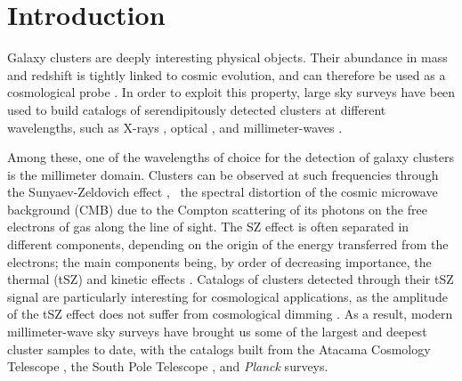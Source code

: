\section{Introduction}
\label{sec:intro}

Galaxy clusters are deeply interesting physical objects.
Their abundance in mass and redshift is tightly linked to cosmic evolution, and can therefore be used as a cosmological probe \citep[see \eg][for a review]{allen_cosmological_2011}.
In order to exploit this property, large sky surveys have been used to build catalogs of serendipitously detected clusters at different wavelengths, such as X-rays \citep[\eg][]{liu_erosita_2022}, optical \citep[\eg][]{des_collaboration_dark_2020}, and millimeter-waves \citep[\eg][]{bleem_sptpol_2020}.

Among these, one of the wavelengths of choice for the detection of galaxy clusters is the millimeter domain.
Clusters can be observed at such frequencies through the Sunyaev-Zeldovich effect \citep[SZ,][]{sunyaev_observations_1972}, \ie\ the spectral distortion of the cosmic microwave background (CMB) due to the Compton scattering of its photons on the free electrons of gas along the line of sight.
The SZ effect is often separated in different components, depending on the origin of the energy transferred from the electrons; the main components being, by order of decreasing importance, the thermal (tSZ) and kinetic \citep[kSZ,][]{sunyaev_velocity_1980} effects \citep[see][for a recent review of the SZ effects]{mroczkowski_astrophysics_2019}.
Catalogs of clusters detected through their tSZ signal are particularly interesting for cosmological applications, as the amplitude of the tSZ effect does not suffer from cosmological dimming \citep{carlstrom_cosmology_2002}.
As a result, modern millimeter-wave sky surveys have brought us some of the largest and deepest cluster samples to date, with the catalogs built from the Atacama Cosmology Telescope \citep[ACT,][]{hilton_atacama_2021}, the South Pole Telescope \citep[SPT,][]{bleem_sptpol_2020}, and \textit{Planck} \citep{planck_collaboration_planck_2016-2} surveys.

